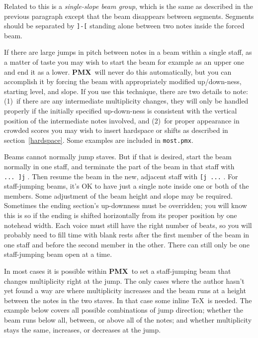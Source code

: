 \documentclass[11pt]{article}
\newcommand\PMXX{\textbf{PMX}}
\newcommand\PMX{\PMXX~}
\def\newfrom{2.59}  %
\def\NEW#1{\ifdim#1 pt<\newfrom pt\else%
\marginpar{\fbox{#1}}\fi}
\begin{document}
Related \NEW{2.3} to this is a {\it single-slope beam group}, which is the 
same as described
in the previous paragraph except that the beam disappears between segments. 
Segments should be separated by {\tt ]-[} standing alone between two notes 
inside the forced beam.

        If there are large jumps in pitch between notes in a beam within
a single staff, as a matter of taste you may wish 
to start the beam for example as an upper one and end it as a 
lower.  \PMX will never do this automatically, but you can accomplish
it by forcing the beam with appropriately modified up/down-ness, starting level,
and slope.  If you use this technique, there are two details to note: (1)~if 
there are any intermediate multiplicity changes, they will only be handled
properly if the initially specified up-down-ness is consistent with the 
vertical position
of the intermediate notes involved, and (2)~for proper appearance in crowded
scores you may wish
to insert hardspace or shifts as described in 
section~\ref{hardspace}.  Some examples are included in {\tt most.pmx}. 

       Beams cannot normally jump staves.  But if that is desired, start
the beam normally in one staff, and terminate the part of the beam in that
staff with {\tt ...~]j} .  Then resume the beam in the new, adjacent staff with 
{\tt [j~...} . For staff-jumping beams, it's OK to have just a single note 
inside one or both of the members.  Some adjustment of the beam height and
slope may be required.  Sometimes the ending section's up-downness must be 
overridden; you will know this is so if the ending is shifted horizontally 
from its proper position by one notehead width.  
Each voice must still have the right number
of beats, so you will probably need to fill time with blank rests after the 
first member of the beam in one staff and before the second member in the other.  
There can still only be one staff-jumping beam open at a time. 

	\label{Jumps}In most cases \NEW{2.91} it is possible within \PMX to set a staff-jumping 
beam that changes multiplicity right at the jump. The only cases where the author 
hasn't yet found a way are where multiplicity increases and the beam runs 
at a height between the notes in the two staves. In that case some inline \TeX\  
is needed. The example below covers all possible combinations of jump direction;
whether the beam runs below all, between, or above all of the notes; and
whether multiplicity stays the same, increases, or decreases at the jump.
\end{document}
